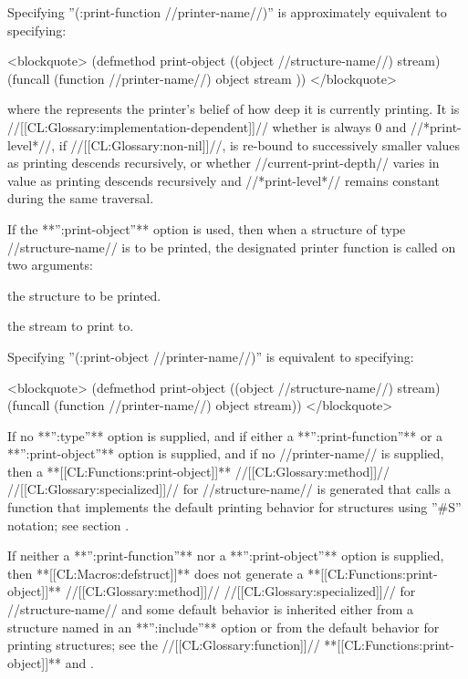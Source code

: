 \endlist

Specifying ''(:print-function //printer-name//)'' is approximately equivalent to specifying:

<blockquote> (defmethod print-object ((object //structure-name//) stream) (funcall (function //printer-name//) object stream )) </blockquote>

where the  represents the printer's belief of how deep it is currently printing. It is //[[CL:Glossary:implementation-dependent]]// whether  is always 0 and //*print-level*//, if //[[CL:Glossary:non-nil]]//, is re-bound to successively smaller values as printing descends recursively, or whether //current-print-depth// varies in value as printing descends recursively and //*print-level*// remains constant during the same traversal.

If the **'':print-object''** option is used, then when a structure of type //structure-name// is to be printed, the designated printer function is called on two arguments:

\beginlist

\itemitem{--} the structure to be printed.

\itemitem{--} the stream to print to.

\endlist

Specifying ''(:print-object //printer-name//)'' is equivalent to specifying:

<blockquote> (defmethod print-object ((object //structure-name//) stream) (funcall (function //printer-name//) object stream)) </blockquote>

If no **'':type''** option is supplied, and if either a **'':print-function''** or a **'':print-object''** option is supplied, and if no //printer-name// is supplied, then a **[[CL:Functions:print-object]]** //[[CL:Glossary:method]]// //[[CL:Glossary:specialized]]// for //structure-name// is generated that calls a function that implements the default printing behavior for structures using ''#S'' notation; see section {\secref\PrintingStructures}.

If neither a **'':print-function''** nor a **'':print-object''** option is supplied, then **[[CL:Macros:defstruct]]** does not generate a **[[CL:Functions:print-object]]** //[[CL:Glossary:method]]// //[[CL:Glossary:specialized]]// for //structure-name// and some default behavior is inherited either from a structure named in an **'':include''** option or from the default behavior for printing structures; see the //[[CL:Glossary:function]]// **[[CL:Functions:print-object]]** and \secref\PrintingStructures.

